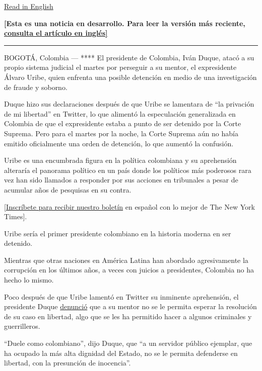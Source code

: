\href{https://www.nytimes3xbfgragh.onion/2020/08/04/world/americas/colombia-president-uribe-charged.html}{Read
in English}

\textbf{{[}Esta es una noticia en desarrollo. Para leer la versión más
reciente,}
\textbf{\href{https://www.nytimes3xbfgragh.onion/2020/08/04/world/americas/colombia-president-uribe-charged.html}{consulta
el artículo en inglés{]}}}

\begin{center}\rule{0.5\linewidth}{\linethickness}\end{center}

BOGOTÁ, Colombia --- **** El presidente de Colombia, Iván Duque, atacó a
su propio sistema judicial el martes por perseguir a su mentor, el
expresidente Álvaro Uribe, quien enfrenta una posible detención en medio
de una investigación de fraude y soborno.

Duque hizo sus declaraciones después de que Uribe se lamentara de ``la
privación de mi libertad'' en Twitter, lo que alimentó la especulación
generalizada en Colombia de que el expresidente estaba a punto de ser
detenido por la Corte Suprema. Pero para el martes por la noche, la
Corte Suprema aún no había emitido oficialmente una orden de detención,
lo que aumentó la confusión.

Uribe es una encumbrada figura en la política colombiana y su
aprehensión alteraría el panorama político en un país donde los
políticos más poderosos rara vez han sido llamados a responder por sus
acciones en tribunales a pesar de acumular años de pesquisas en su
contra.

\href{https://www.nytimes3xbfgragh.onion/newsletters/el-times}{{[}Inscríbete
para recibir nuestro boletín} en español con lo mejor de The New York
Times{]}.

Uribe sería el primer presidente colombiano en la historia moderna en
ser detenido.

Mientras que otras naciones en América Latina han abordado agresivamente
la corrupción en los últimos años, a veces con juicios a presidentes,
Colombia no ha hecho lo mismo.

Poco después de que Uribe lamentó en Twitter su inminente aprehensión,
el presidente Duque
\href{https://twitter.com/IvanDuque/status/1290755832330813442}{denunció}
que a su mentor no se le permita esperar la resolución de su caso en
libertad, algo que se les ha permitido hacer a algunos criminales y
guerrilleros.

``Duele como colombiano'', dijo Duque, que ``a un servidor público
ejemplar, que ha ocupado la más alta dignidad del Estado, no se le
permita defenderse en libertad, con la presunción de inocencia''.

